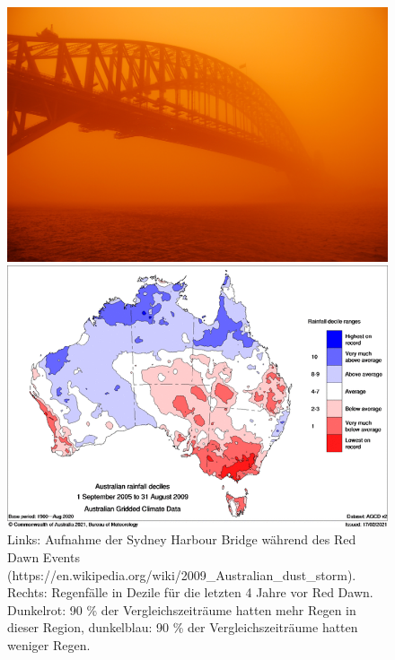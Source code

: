 \documentclass[12pt,a4paper,onecolumn]{scrartcl}
\begin{document}
\begin{figure}
	\begin{minipage}[c]{0.5\textwidth}
		\includegraphics[width=\textwidth]{bilder/reddawn/SHB.jpg}
	\end{minipage}\hfill
	\begin{minipage}[c]{0.49\textwidth}
		\includegraphics[width=\textwidth]{bilder/reddawn/drought.png}
	\end{minipage}\hfill
	\caption{Links: Aufnahme der Sydney Harbour Bridge während des Red Dawn Events (https://en.wikipedia.org/wiki/2009_Australian_dust_storm). Rechts: Regenfälle in Dezile für die letzten 4 Jahre vor Red Dawn. Dunkelrot: 90 \% der Vergleichszeiträume hatten mehr Regen in dieser Region, dunkelblau: 90 \% der Vergleichszeiträume hatten weniger Regen.} \label{fig:reddawn}
\end{figure}
\end{document}

